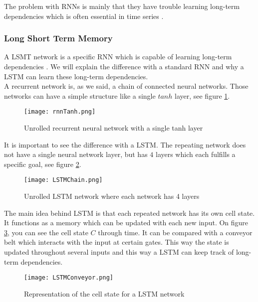 The problem with RNNs is mainly that they have trouble learning long-term dependencies which is often essential in time series \cite{longDepRNN:article}.


\subsubsection{Long Short Term Memory}
\label{sec:lstm}

A LSMT network is a specific RNN which is capable of learning long-term dependencies \cite{lstmDep:thesis}. We will explain the difference with a standard RNN and why a LSTM can learn these long-term dependencies. \\

A recurrent network is, as we said, a chain of connected neural networks. Those networks can have a simple structure like a single $tanh$ layer, see figure \ref{fig:rnnTanh}. \\

\begin{figure}[!htb]
	\centering
	\texttt{[image: rnnTanh.png]}
	\caption{Unrolled recurrent neural network with a single tanh layer \cite{lstmGood:online}}
	\label{fig:rnnTanh}
\end{figure} 

It is important to see the difference with a LSTM. The repeating network does not have a single neural network layer, but has $4$ layers which each fulfills a specific goal, see figure \ref{fig:LSTMChain}.\\

\begin{figure}[!htb]
	\centering
	\texttt{[image: LSTMChain.png]}
	\caption{Unrolled LSTM network where each network has 4 layers \cite{lstmGood:online}}
	\label{fig:LSTMChain}
\end{figure} 

The main idea behind LSTM is that each repeated network has its own cell state. It functions as a  memory which can be updated with each new input. On figure \ref{fig:LSTMConveyor}, you can see the cell state $C$ through time. It can be compared with a conveyor belt which interacts with the input at certain gates. This way the state is updated throughout several inputs and this way a LSTM can keep track of long-term dependencies. \\

\begin{figure}[!htb]
	\centering
	\texttt{[image: LSTMConveyor.png]}
	\caption{Representation of the cell state for a LSTM network \cite{lstmGood:online}}
	\label{fig:LSTMConveyor}
\end{figure} 

